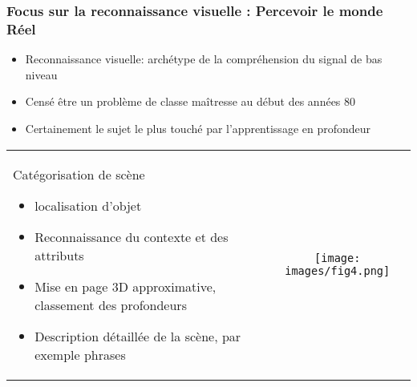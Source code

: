 \documentclass[9pt]{beamer}
\begin{document}
\begin{frame}
\frametitle{Focus sur la reconnaissance visuelle : Percevoir le monde Réel}
\begin{itemize}
\item Reconnaissance visuelle: archétype de la compréhension du signal de bas niveau 
\item Censé être un problème de classe maîtresse au début des années 80
\item Certainement le sujet le plus touché par l'apprentissage en profondeur
\end{itemize}

\begin{tabular}{lc}
\begin{minipage}{4cm}
Catégorisation de scène
\begin{itemize}
\item localisation d'objet
\item Reconnaissance du contexte et des attributs
\item Mise en page 3D approximative, classement des profondeurs
\item Description détaillée de la scène, par exemple phrases
\end{itemize}
\end{minipage}

 &
 
 \begin{minipage}{4cm}
\begin{center}
 \texttt{[image: images/fig4.png]}  
\end{center}
 \end{minipage}
\end{tabular}
\end{frame}
\end{document}

